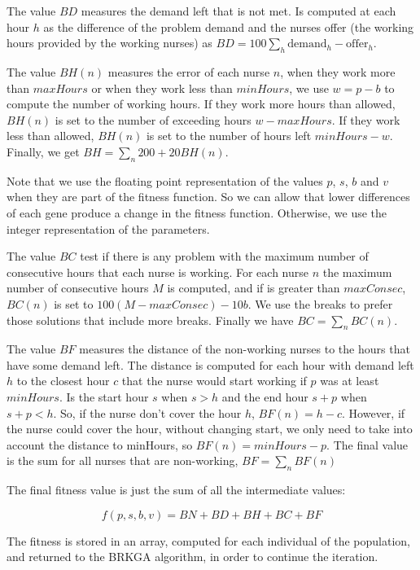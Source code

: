 \documentclass[12pt,a4paper]{article}
\begin{document}
The value $BD$ measures the demand left that is not met. Is computed at each 
hour $h$ as the difference of the problem demand and the nurses offer (the 
working hours provided by the working nurses) as $BD = 100 \sum_h 
\textrm{demand}_h - \textrm{offer}_h$.

The value $BH(n)$ measures the error of each nurse $n$, when they work more than 
$maxHours$ or when they work less than $minHours$, we use $w = p - b$ to compute 
the number of working hours. If they work more hours than allowed, $BH(n)$ is 
set to the number of exceeding hours $w - maxHours$. If they work less than 
allowed, $BH(n)$ is set to the number of hours left $minHours - w$.  Finally, we 
get $BH = \sum_n 200 + 20 BH(n)$.

Note that we use the floating point representation of the values $p$, $s$, $b$ 
and $v$ when they are part of the fitness function. So we can allow that lower 
differences of each gene produce a change in the fitness function. Otherwise, we 
use the integer representation of the parameters.

The value $BC$ test if there is any problem with the maximum number of 
consecutive hours that each nurse is working. For each nurse $n$ the maximum 
number of consecutive hours $M$ is computed, and if is greater than $maxConsec$, 
$BC(n)$ is set to $100(M - maxConsec) - 10b$. We use the breaks to prefer those 
solutions that include more breaks. Finally we have $BC = \sum_n BC(n)$.

The value $BF$ measures the distance of the non-working nurses to the hours that 
have some demand left. The distance is computed for each hour with demand left 
$h$ to the closest hour $c$ that the nurse would start working if $p$ was at 
least $minHours$. Is the start hour $s$ when $s > h$ and the end hour $s+p$ when 
$s+p < h$. So, if the nurse don't cover the hour $h$, $BF(n) = h - c$. However, 
if the nurse could cover the hour, without changing start, we only need to take 
into account the distance to minHours, so $BF(n) = minHours - p$. The final 
value is the sum for all nurses that are non-working, $BF = \sum_n BF(n)$

The final fitness value is just the sum of all the intermediate values:

$$ f(p,s,b,v) = BN + BD + BH + BC + BF $$

The fitness is stored in an array, computed for each individual of the 
population, and returned to the BRKGA algorithm, in order to continue the 
iteration.
\end{document}
